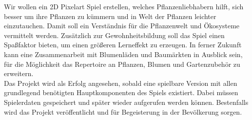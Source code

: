 Wir wollen ein 2D Pixelart Spiel erstellen, welches Pflanzenliebhabern hilft, sich besser um ihre Pflanzen zu kümmern 
und in Welt der Pflanzen leichter einzutauchen. 
Damit soll ein Verständnis für die Pflanzenwelt und Ökosysteme vermittelt werden.
Zusätzlich zur Gewohnheitsbildung soll das Spiel einen Spaßfaktor bieten, um einen größeren Lerneffekt zu erzeugen.
In ferner Zukunft kann eine Zusammenarbeit mit Blumenläden und Baumärkten in Ausblick sein, für die Möglichkeit 
das Repertoire an Pflanzen, Blumen und Gartenzubehör zu erweitern. \\[7pt]
Das Projekt wird als Erfolg angesehen, sobald eine spielbare Version mit allen grundlegend benötigten Hauptkomponenten 
des Spiels existiert.
Dabei müssen Spielerdaten gespeichert und später wieder aufgerufen werden können.
Bestenfalls wird das Projekt veröffentlicht und für Begeisterung in der Bevölkerung sorgen.